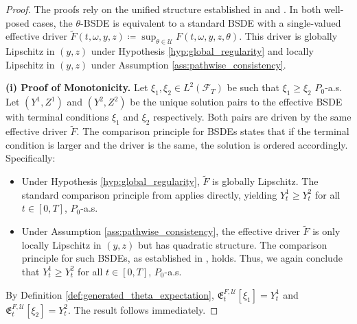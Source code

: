 \documentclass[12pt, letterpaper]{amsart}
\newcommand{\Efrak}{\mathfrak{E}}
\newcommand{\Efrakgen}{\Efrak^{F, \Ucal}}
\newcommand{\Ucal}{\mathcal{U}}
\theoremstyle{plain}
\theoremstyle{definition}
\theoremstyle{remark}
\numberwithin{equation}{section} %
\begin{document}
\begin{proof}
The proofs rely on the unified structure established in  and . In both well-posed cases, the $\theta$-BSDE is equivalent to a standard BSDE with a single-valued effective driver $\tilde{F}(t,\omega,y,z) \coloneqq \sup_{\theta \in \Ucal} F(t,\omega,y,z,\theta)$. This driver is globally Lipschitz in $(y,z)$ under Hypothesis \ref{hyp:global_regularity} and locally Lipschitz in $(y,z)$ under Assumption \ref{ass:pathwise_consistency}.

\vspace{1ex}
\noindent\textbf{(i) Proof of Monotonicity.}
Let $\xi_1, \xi_2 \in L^2(\mathcal{F}_T)$ be such that $\xi_1 \ge \xi_2$ $P_0$-a.s. Let $(Y^1, Z^1)$ and $(Y^2, Z^2)$ be the unique solution pairs to the effective BSDE with terminal conditions $\xi_1$ and $\xi_2$ respectively. Both pairs are driven by the same effective driver $\tilde{F}$. The comparison principle for BSDEs states that if the terminal condition is larger and the driver is the same, the solution is ordered accordingly. Specifically:
\begin{itemize}
    \item Under Hypothesis \ref{hyp:global_regularity}, $\tilde{F}$ is globally Lipschitz. The standard comparison principle from \cite{ElKaroui1997} applies directly, yielding $Y^1_t \ge Y^2_t$ for all $t \in [0,T]$, $P_0$-a.s.
    \item Under Assumption \ref{ass:pathwise_consistency}, the effective driver $\tilde{F}$ is only locally Lipschitz in $(y,z)$ but has quadratic structure. The comparison principle for such BSDEs, as established in \cite{Kobylanski2000}, holds. Thus, we again conclude that $Y^1_t \ge Y^2_t$ for all $t \in [0,T]$, $P_0$-a.s.
\end{itemize}
By Definition \ref{def:generated_theta_expectation}, $\Efrakgen_t[\xi_1] = Y^1_t$ and $\Efrakgen_t[\xi_2] = Y^2_t$. The result follows immediately.


\end{proof}
\end{document}
